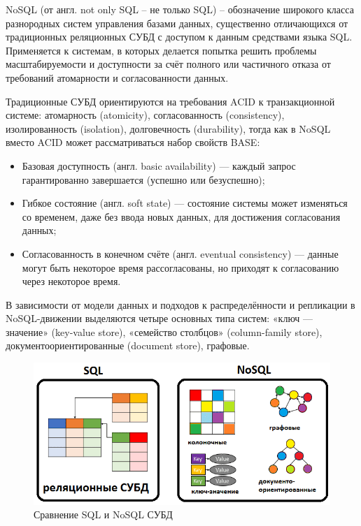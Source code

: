NoSQL (от англ. not only SQL -- не только SQL) -- обозначение широкого класса
разнородных систем управления базами данных, существенно отличающихся от
традиционных реляционных СУБД с доступом к данным средствами языка SQL.
Применяется к системам, в которых делается попытка решить проблемы
масштабируемости и доступности за счёт полного или частичного отказа от
требований атомарности и согласованности данных.

Традиционные СУБД ориентируются на требования ACID к транзакционной системе:
атомарность (atomicity), согласованность (consistency), изолированность
(isolation), долговечность (durability), тогда как в NoSQL вместо ACID может
рассматриваться набор свойств BASE:
\begin{itemize}
    \item Базовая доступность (англ. basic availability) — каждый запрос гарантированно завершается (успешно или безуспешно);
    \item Гибкое состояние (англ. soft state) — состояние системы может изменяться со временем, даже без ввода новых данных, для достижения согласования данных;
    \item Согласованность в конечном счёте (англ. eventual consistency) — данные могут быть некоторое время рассогласованы, но приходят к согласованию через некоторое время.
\end{itemize}


В зависимости от модели данных и подходов к распределённости и репликации в
NoSQL-движении выделяются четыре основных типа систем: «ключ — значение»
(key-value store), «семейство столбцов» (column-family store),
документоориентированные (document store), графовые.
\begin{figure}[H]
    \centering
    \includegraphics[scale=0.45]{inc/img/sql-vs-nosql.png}
    \caption{Сравнение SQL и NoSQL СУБД}
\end{figure}

